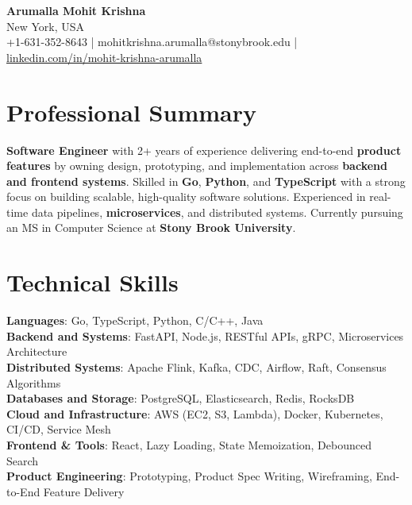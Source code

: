 \documentclass[letterpaper,11pt]{article}
\begin{document}
\begin{center}
  {\Large \textbf{Arumalla Mohit Krishna}} \\
  New York, USA \\
  +1-631-352-8643 \enspace | \enspace mohitkrishna.arumalla@stonybrook.edu \enspace | \enspace \href{https://www.linkedin.com/in/mohit-krishna-arumalla}{linkedin.com/in/mohit-krishna-arumalla}
\end{center}

\section{Professional Summary}
  \begin{itemize}[leftmargin=0.15in, label={}]
    \small{\item{
     \textbf{Software Engineer} with 2+ years of experience delivering end-to-end \textbf{product features} by owning design, prototyping, and implementation across \textbf{backend and frontend systems}. Skilled in \textbf{Go}, \textbf{Python}, and \textbf{TypeScript} with a strong focus on building scalable, high-quality software solutions. Experienced in real-time data pipelines, \textbf{microservices}, and distributed systems. Currently pursuing an MS in Computer Science at \textbf{Stony Brook University}.
    }}
  \end{itemize}
\vspace{-16pt}

\section{Technical Skills}
 \begin{itemize}[leftmargin=0.15in, label={}]
    \small{\item{
     \textbf{Languages}: Go, TypeScript, Python, C/C++, Java \\
     \textbf{Backend and Systems}: FastAPI, Node.js, RESTful APIs, gRPC, Microservices Architecture \\
     \textbf{Distributed Systems}: Apache Flink, Kafka, CDC, Airflow, Raft, Consensus Algorithms \\
     \textbf{Databases and Storage}: PostgreSQL, Elasticsearch, Redis, RocksDB \\
     \textbf{Cloud and Infrastructure}: AWS (EC2, S3, Lambda), Docker, Kubernetes, CI/CD, Service Mesh \\
     \textbf{Frontend \& Tools}: React, Lazy Loading, State Memoization, Debounced Search \\
     \textbf{Product Engineering}: Prototyping, Product Spec Writing, Wireframing, End-to-End Feature Delivery
    }}
 \end{itemize}
\vspace{-16pt}
\end{document}

